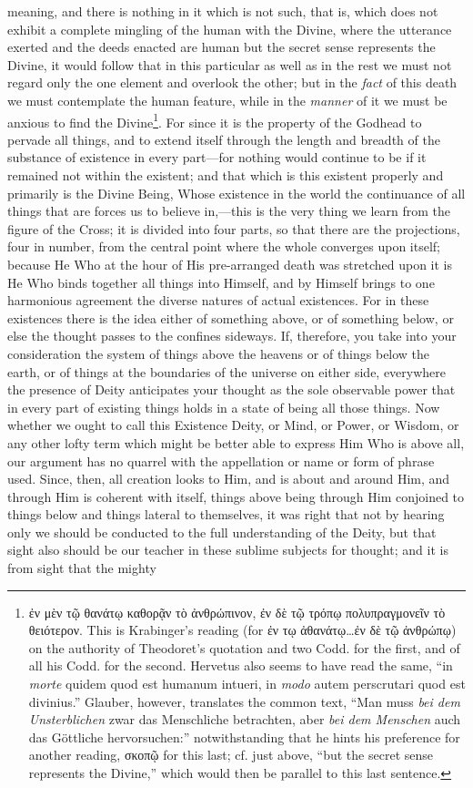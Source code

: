 meaning, and there is nothing in it which is not such, that is, which does not exhibit a complete mingling of the human with the Divine, where the utterance exerted and the deeds enacted are human but the secret sense represents the Divine, it would follow that in this particular as well as in the rest we must not regard only the one element and overlook the other; but in the \emph{fact} of this death we must contemplate the human feature, while in the \emph{manner} of it we must be anxious to find the Divine\footnote{\textgreek{ἐν μὲν τῷ θανάτῳ καθορᾷν τὸ ἀνθρώπινον, ἐν δὲ τῷ τρόπῳ πολυπραγμονεῖν τὸ θειότερον}. This is Krabinger’s reading (for \textgreek{ἐν τῳ ἀθανάτῳ…ἐν δὲ τῷ ἀνθρώπῳ}) on the authority of Theodoret’s quotation and two Codd. for the first, and of all his Codd. for the second. Hervetus also seems to have read the same, “in \emph{morte} quidem quod est humanum intueri, in \emph{modo} autem perscrutari quod est divinius.” Glauber, however, translates the common text, “Man muss \emph{bei dem Unsterblichen} zwar das Menschliche betrachten, aber \emph{bei dem Menschen} auch das Göttliche hervorsuchen:” notwithstanding that he hints his preference for another reading, \textgreek{σκοπῷ} for this last; cf. just above, “but the secret sense represents the Divine,” which would then be parallel to this last sentence.}. For since it is the property of the Godhead to pervade all things, and to extend itself through the length and breadth of the substance of existence in every part—for nothing would continue to be if it remained not within the existent; and that which is this existent properly and primarily is the Divine Being, Whose existence in the world the continuance of all things that are forces us to believe in,—this is the very thing we learn from the figure of the Cross; it is divided into four parts, so that there are the projections, four in number, from the central point where the whole converges upon itself; because He Who at the hour of His pre-arranged death was stretched upon it is He Who binds together all things into Himself, and by Himself brings to one harmonious agreement the diverse natures of actual existences. For in these existences there is the idea either of something above, or of something below, or else the thought passes to the confines sideways. If, therefore, you take into your consideration the system of things above the heavens or of things below the earth, or of things at the boundaries of the universe on either side, everywhere the presence of Deity anticipates your thought as the sole observable power that in every part of existing things holds in a state of being all those things. Now whether we ought to call this Existence Deity, or Mind, or Power, or Wisdom, or any other lofty term which might be better able to express Him Who is above all, our argument has no quarrel with the appellation or name or form of phrase used. Since, then, all creation looks to Him, and is about and around Him, and through Him is coherent with itself, things above being through Him conjoined to things below and things lateral to themselves, it was right that not by hearing only we should be conducted to the full understanding of the Deity, but that sight also should be our teacher in these sublime subjects for thought; and it is from sight that the mighty 